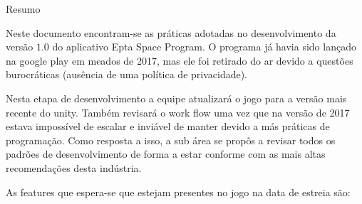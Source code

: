 {
	\thispagestyle{empty}     %
	
	{\LARGE Resumo} %
    \vspace{1cm}
	
    Neste documento encontram-se as práticas adotadas no desenvolvimento da versão $1.0$ do aplicativo Epta Space Program. O programa já havia sido lançado na google play em meados de 2017, mas ele foi retirado do ar devido a questões burocráticas (ausência de uma política de privacidade). 

    Nesta etapa de desenvolvimento a equipe atualizará o jogo para a versão mais recente do unity.
    Também revisará o work flow uma vez que na versão de 2017 estava impossível de escalar e inviável de manter devido a más práticas de programação.
    Como resposta a isso, a sub área se propôs a revisar todos os padrões de desenvolvimento de forma a estar conforme com as mais altas recomendações desta indústria.

    As features que espera-se que estejam presentes no jogo na data de estreia são:

}
